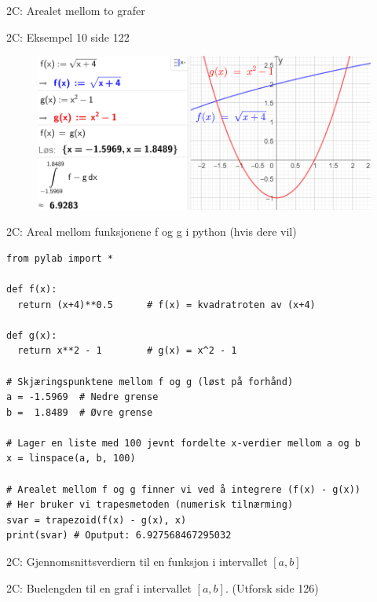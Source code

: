 \redheader
\begin{frame}{2C: Arealet mellom to grafer}
\end{frame}

\greenheader\begin{frame}{2C: Eksempel 10 side 122}
\begin{figure}
    \centering
    \includegraphics[width=\linewidth]{R2-K2C-7.png}
\end{figure}
\end{frame}

\greenheader
\begin{frame}[fragile]{2C: Areal mellom funksjonene f og g i python (hvis dere vil)}
\begin{verbatim}
from pylab import *

def f(x):
  return (x+4)**0.5      # f(x) = kvadratroten av (x+4)

def g(x):
  return x**2 - 1        # g(x) = x^2 - 1

# Skjæringspunktene mellom f og g (løst på forhånd)
a = -1.5969  # Nedre grense
b =  1.8489  # Øvre grense

# Lager en liste med 100 jevnt fordelte x-verdier mellom a og b
x = linspace(a, b, 100)

# Arealet mellom f og g finner vi ved å integrere (f(x) - g(x))
# Her bruker vi trapesmetoden (numerisk tilnærming)
svar = trapezoid(f(x) - g(x), x)
print(svar) # Oputput: 6.927568467295032
\end{verbatim}
\end{frame}





\redheader
\begin{frame}{2C: Gjennomsnittsverdiern til en funksjon i intervallet $[a, b]$}
\end{frame}


\magentaheader
\begin{frame}{2C: Buelengden til en graf i intervallet $[a, b]$. (Utforsk side 126)}
\end{frame}



